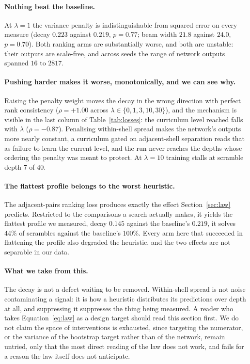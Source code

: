 \documentclass{article}
\begin{document}
\paragraph{Nothing beat the baseline.} At $\lambda = 1$ the variance penalty is
indistinguishable from squared error on every measure (decay $0.223$ against
$0.219$, $p = 0.77$; beam width $21.8$ against $24.0$, $p = 0.70$). Both ranking
arms are substantially worse, and both are unstable: their outputs are
scale-free, and across seeds the range of network outputs spanned $16$ to $2817$.

\paragraph{Pushing harder makes it worse, monotonically, and we can see why.}
Raising the penalty weight moves the decay in the wrong direction with perfect
rank consistency ($\rho = +1.00$ across $\lambda \in \{0,1,3,10,30\}$), and the
mechanism is visible in the last column of Table~\ref{tab:losses}: the curriculum
level reached falls with $\lambda$ ($\rho = -0.87$). Penalising within-shell
spread makes the network's outputs more nearly constant, a curriculum gated on
adjacent-shell separation reads that as failure to learn the current level, and
the run never reaches the depths whose ordering the penalty was meant to protect.
At $\lambda = 10$ training stalls at scramble depth 7 of 40.

\paragraph{The flattest profile belongs to the worst heuristic.} The
adjacent-pairs ranking loss produces exactly the effect
Section~\ref{sec:law} predicts. Restricted to the comparisons a search
actually makes, it yields the flattest profile we measured, decay $0.145$ against
the baseline's $0.219$, it solves 44\% of scrambles against the baseline's
100\%. Every arm here that succeeded in flattening the profile also degraded the
heuristic, and the two effects are not separable in our data.

\paragraph{What we take from this.} The decay is not a defect waiting to be
removed. Within-shell spread is not noise contaminating a signal: it is how a
heuristic distributes its predictions over depth at all, and suppressing it
suppresses the thing being measured. A reader who takes Equation~\ref{eq:law} as
a design target should read this section first. We do not claim the space of
interventions is exhausted, since targeting the numerator, or the variance of the
bootstrap target rather than of the network, remain untried, only that the
most direct reading of the law does not work, and fails for a reason the law
itself does not anticipate.
\end{document}
